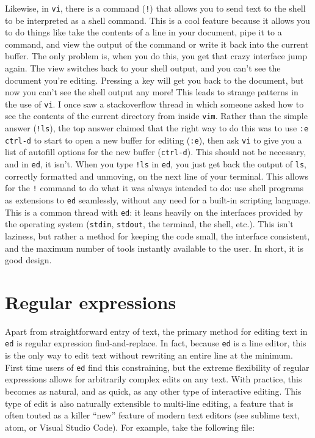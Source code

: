 \documentclass[12pt]{article}
\begin{document}
Likewise, in \lstinline{vi}, there is a command (\lstinline{!}) that allows you
to send text to the shell to be interpreted as a shell command.
This is a cool feature because it allows you to do things like
take the contents of a line in your document, pipe it to a command,
and view the output of the command or write it back into the current buffer.
The only problem is, when you do this, you get that crazy interface jump
again. The view switches back to your shell output, and you can't see
the document you're editing. Pressing a key will get you back to the document,
but now you can't see the shell output any more! This leads to strange
patterns in the use of \lstinline{vi}. I once saw a stackoverflow thread
in which someone asked how to see the contents of the current directory from
inside \lstinline{vim}. Rather than the simple answer (\lstinline{!ls}), the
top answer claimed that the right way to do this was to use \lstinline{:e ctrl-d}
to start to open a new buffer for editing (\lstinline{:e}), then ask \lstinline{vi}
to give you a list of autofill options for the new buffer (\lstinline{ctrl-d}).
This should not be necessary, and in \lstinline{ed}, it isn't. When you type
\lstinline{!ls} in \lstinline{ed}, you just get back 
the output of \lstinline{ls}, correctly formatted and unmoving, on the next
line of your terminal. This allows for the \lstinline{!} command to do what
it was always intended to do: use shell programs as extensions to \lstinline{ed}
seamlessly, without any need for a built-in scripting language.
This is a common thread with \lstinline{ed}: it leans heavily on the interfaces provided
by the operating system (\lstinline{stdin}, \lstinline{stdout}, the terminal, the shell, etc.).
This isn't laziness, but rather a method for keeping the code small, the interface consistent,
and the maximum number of tools instantly available to the user. In short, it is good design.

\section{Regular expressions}

Apart from straightforward entry of text, the primary method
for editing text in \lstinline{ed} is regular expression
find-and-replace. In fact, because \lstinline{ed} is a line editor,
this is the only way to edit text without rewriting an entire line
at the minimum. First time users of \lstinline{ed} find this
constraining, but the extreme flexibility of regular expressions
allows for arbitrarily complex edits on any text. With practice,
this becomes as natural, and as quick, as any other type of interactive
editing. This type of edit is also naturally extensible to multi-line
editing, a feature that is often touted as a killer ``new'' feature of
modern text editors (see sublime text, atom, or Visual Studio Code).
For example, take the following file:
\end{document}
